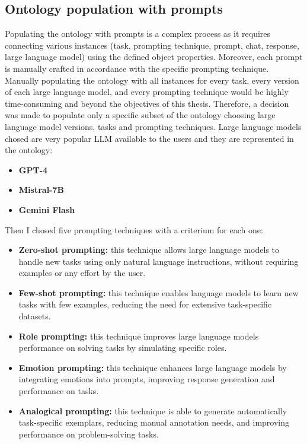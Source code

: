 \subsection{Ontology population with prompts}
Populating the ontology with prompts is a complex process as it requires connecting various instances (task, prompting technique, prompt, chat, response, large language model) using the defined object properties. Moreover, each prompt is manually crafted in accordance with the specific prompting technique. Manually populating the ontology with all instances for every task, every version of each large language model, and every prompting technique would be highly time-consuming and beyond the objectives of this thesis. Therefore, a decision was made to populate only a specific subset of the ontology choosing large language model versions, tasks and prompting techniques. Large language models chosed are very popular LLM available to the users and they are represented in the ontology:
\begin{itemize}
    \item \textbf{GPT-4}
    \item \textbf{Mistral-7B}
    \item \textbf{Gemini Flash}
\end{itemize}
Then I chosed five prompting techniques with a criterium for each one:
\begin{itemize}
    \item \textbf{Zero-shot prompting:} this technique allows large language models to handle new tasks using only natural language instructions, without requiring examples or any effort by the user.

    \item \textbf{Few-shot prompting:} this technique  enables language models to learn new tasks with few examples, reducing the need for extensive task-specific datasets.
    
    \item \textbf{Role prompting:} this technique improves large language models performance on solving tasks by simulating specific roles.

    \item \textbf{Emotion prompting:} this technique enhances large language models by integrating emotions into prompts, improving response generation and performance on tasks.

    \item \textbf{Analogical prompting:} this technique is able to generate automatically task-specific exemplars, reducing manual annotation needs, and improving performance on problem-solving tasks.
\end{itemize}

